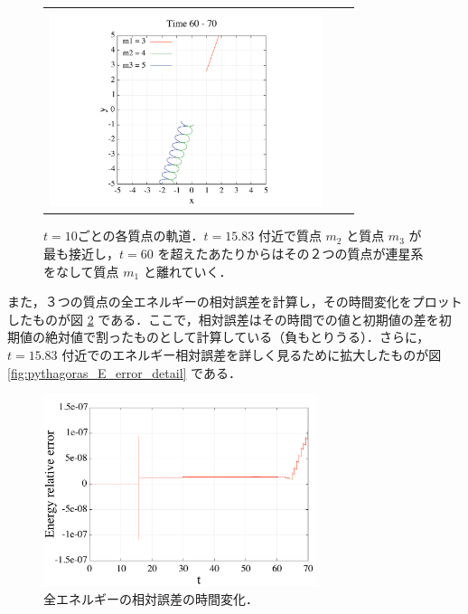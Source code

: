 \documentclass[11pt,a4paper,oneside,onecolumn]{jreport}
\begin{document}
\begin{figure}[H]
\begin{tabular}{ccc}
\begin{minipage}[t]{0.45\hsize}
\end{minipage}\\
%
\begin{minipage}[t]{0.45\hsize}
\centering
\includegraphics[width=8cm]{./image/pythagoras_orbit_60to70.pdf}
\end{minipage}
\end{tabular}
\caption{$t = 10$ごとの各質点の軌道．$t = 15.83$ 付近で質点 $m_2$ と質点 $m_3$ が最も接近し，$t = 60$ を超えたあたりからはその２つの質点が連星系をなして質点 $m_1$ と離れていく．\label{fig:pythagoras_orbit}}
\end{figure}

また，３つの質点の全エネルギーの相対誤差を計算し，その時間変化をプロットしたものが図 \ref{fig:pythagoras_E_error} である．ここで，相対誤差はその時間での値と初期値の差を初期値の絶対値で割ったものとして計算している（負もとりうる）．さらに，$t = 15.83$ 付近でのエネルギー相対誤差を詳しく見るために拡大したものが図 \ref{fig:pythagoras_E_error_detail} である．
\begin{figure}[H]
\centering
\includegraphics[width=8cm]{./image/pythagoras_E_error.pdf}
\caption{全エネルギーの相対誤差の時間変化．\label{fig:pythagoras_E_error}}
\end{figure}
\end{document}
